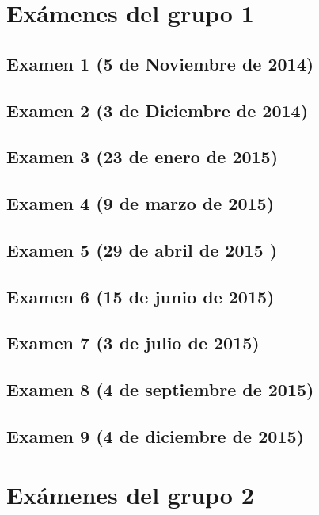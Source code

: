 \documentclass[a4paper,12pt,twoside]{book}
\begin{document}
\chapter{Exámenes del grupo 1} 
\section{Examen 1 (5 de Noviembre de 2014)}
\section{Examen 2 (3 de Diciembre de 2014)}
\section{Examen 3 (23 de enero de 2015)}
 \label{examen_14_15_1_3}
\section{Examen 4 (9 de marzo de 2015)}
\section{Examen 5 (29 de abril de 2015 )}
\section{Examen 6 (15 de junio de 2015)}
\section{Examen 7 (3 de julio de 2015)}
 \label{examen_14_15_1_7}
\section{Examen 8 (4 de septiembre de 2015)}
 \label{examen_14_15_1_8}
\section{Examen 9 (4 de diciembre de 2015)}
 \label{examen_14_15_1_9}

\chapter{Exámenes del grupo 2}
\end{document}
